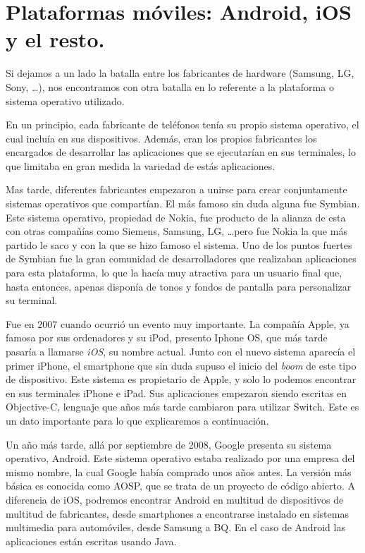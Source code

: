 \section{Plataformas móviles: Android, iOS y el resto.}

Si dejamos a un lado la batalla entre los fabricantes de hardware (Samsung, LG, Sony, \ldots), nos encontramos con otra batalla en lo referente a la plataforma o sistema operativo utilizado.

En un principio, cada fabricante de teléfonos tenía su propio sistema operativo, el cual incluía en sus dispositivos. Además, eran los propios fabricantes los encargados de desarrollar las aplicaciones que se ejecutarían en sus terminales, lo que limitaba en gran medida la variedad de estás aplicaciones.

Mas tarde, diferentes fabricantes empezaron a unirse para crear conjuntamente sistemas operativos que compartían. El más famoso sin duda alguna fue Symbian. Este sistema operativo, propiedad de Nokia, fue producto de la alianza de esta con otras compañías como Siemens, Samsung, LG, \ldots pero fue Nokia la que más partido le saco y con la que se hizo famoso el sistema. Uno de los puntos fuertes de Symbian fue la gran comunidad de desarrolladores que realizaban aplicaciones para esta plataforma, lo que la hacía muy atractiva para un usuario final que, hasta entonces, apenas disponía de tonos y fondos de pantalla para personalizar su terminal.

Fue en 2007 cuando ocurrió un evento muy importante. La compañía Apple, ya famosa por sus ordenadores y su iPod, presento Iphone OS, que más tarde pasaría a llamarse \emph{iOS}, su nombre actual. Junto con el nuevo sistema aparecía el primer iPhone, el smartphone que sin duda supuso el inicio del \emph{boom} de este tipo de dispositivo. Este sistema es propietario de Apple, y solo lo podemos encontrar en sus terminales iPhone e iPad. Sus aplicaciones empezaron siendo escritas en Objective-C, lenguaje que años más tarde cambiaron para utilizar Switch. Este es un dato importante para lo que explicaremos a continuación.

Un año más tarde, allá por septiembre de 2008, Google presenta su sistema operativo, Android. Este sistema operativo estaba realizado por una empresa del mismo nombre, la cual Google había comprado unos años antes. La versión más básica es conocida como \gls{AOSP}, que se trata de un proyecto de código abierto. A diferencia de iOS, podremos encontrar Android en multitud de dispositivos de multitud de fabricantes, desde smartphones a encontrarse instalado en sistemas multimedia para automóviles, desde Samsung a BQ. En el caso de Android las aplicaciones están escritas usando Java.

